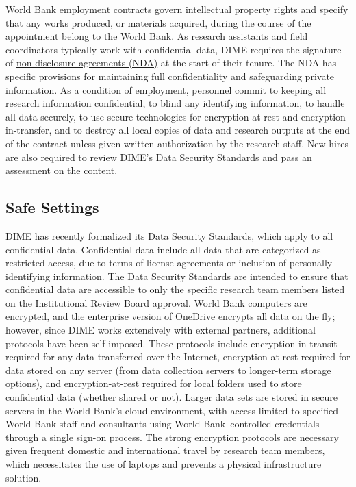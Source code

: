 World Bank employment contracts govern intellectual property rights and specify that any works produced, or materials acquired, during the course of the appointment belong to the World Bank. As research assistants and field coordinators typically work with confidential data, DIME requires the signature of \href{https://github.com/worldbank/dime-standards/blob/master/dime-research-standards/pillar-4-data-security/data-security-resources/dime-data-nda-mou.md}{non-disclosure agreements (NDA)} at the start of their tenure. The NDA has specific provisions for maintaining full confidentiality and safeguarding private information. As a condition of employment, personnel commit to keeping all research information confidential, to blind any identifying information, to handle all data securely, to use secure technologies for encryption-at-rest and encryption-in-transfer, and to destroy all local copies of data and research outputs at the end of the contract unless given written authorization by the research staff. New hires are also required to review DIME's \href{https://github.com/worldbank/dime-standards/tree/master/dime-research-standards/pillar-4-data-security}{Data Security Standards} and pass an assessment on the content.

\hypertarget{safe-settings-6}{%
\subsection{Safe Settings}\label{safe-settings-6}}

DIME has recently formalized its Data Security Standards, which apply to all confidential data. Confidential data include all data that are categorized as restricted access, due to terms of license agreements or inclusion of personally identifying information. The Data Security Standards are intended to ensure that confidential data are accessible to only the specific research team members listed on the Institutional Review Board approval. World Bank computers are encrypted, and the enterprise version of OneDrive encrypts all data on the fly; however, since DIME works extensively with external partners, additional protocols have been self-imposed. These protocols include encryption-in-transit required for any data transferred over the Internet, encryption-at-rest required for data stored on any server (from data collection servers to longer-term storage options), and encryption-at-rest required for local folders used to store confidential data (whether shared or not). Larger data sets are stored in secure servers in the World Bank's cloud environment, with access limited to specified World Bank staff and consultants using World Bank--controlled credentials through a single sign-on process. The strong encryption protocols are necessary given frequent domestic and international travel by research team members, which necessitates the use of laptops and prevents a physical infrastructure solution.

